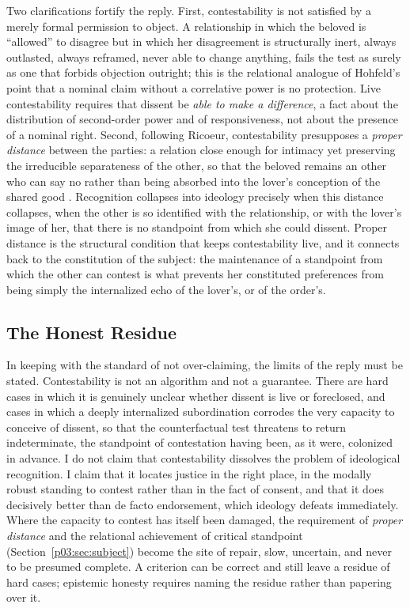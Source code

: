 \documentclass[11pt,a4paper]{article}
\begin{document}
Two clarifications fortify the reply. First, contestability is not satisfied by a merely formal permission to object. A relationship in which the beloved is ``allowed'' to disagree but in which her disagreement is structurally inert, always outlasted, always reframed, never able to change anything, fails the test as surely as one that forbids objection outright; this is the relational analogue of Hohfeld's point that a nominal claim without a correlative power is no protection. Live contestability requires that dissent be \emph{able to make a difference}, a fact about the distribution of second-order power and of responsiveness, not about the presence of a nominal right. Second, following Ricoeur, contestability presupposes a \emph{proper distance} between the parties: a relation close enough for intimacy yet preserving the irreducible separateness of the other, so that the beloved remains an other who can say no rather than being absorbed into the lover's conception of the shared good \parencite{ricoeur2005course}. Recognition collapses into ideology precisely when this distance collapses, when the other is so identified with the relationship, or with the lover's image of her, that there is no standpoint from which she could dissent. Proper distance is the structural condition that keeps contestability live, and it connects back to the constitution of the subject: the maintenance of a standpoint from which the other can contest is what prevents her constituted preferences from being simply the internalized echo of the lover's, or of the order's.

\subsection{The Honest Residue}

In keeping with the standard of not over-claiming, the limits of the reply must be stated. Contestability is not an algorithm and not a guarantee. There are hard cases in which it is genuinely unclear whether dissent is live or foreclosed, and cases in which a deeply internalized subordination corrodes the very capacity to conceive of dissent, so that the counterfactual test threatens to return indeterminate, the standpoint of contestation having been, as it were, colonized in advance. I do not claim that contestability dissolves the problem of ideological recognition. I claim that it locates justice in the right place, in the modally robust standing to contest rather than in the fact of consent, and that it does decisively better than de facto endorsement, which ideology defeats immediately. Where the capacity to contest has itself been damaged, the requirement of \emph{proper distance} and the relational achievement of critical standpoint (Section~\ref{p03:sec:subject}) become the site of repair, slow, uncertain, and never to be presumed complete. A criterion can be correct and still leave a residue of hard cases; epistemic honesty requires naming the residue rather than papering over it.
\end{document}
